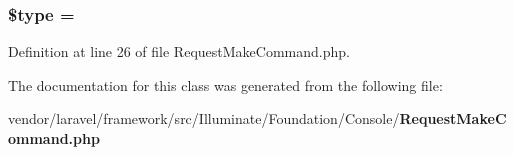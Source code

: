 \subsubsection[{\$type}]{\setlength{\rightskip}{0pt plus 5cm}\$type = \textquotesingle{}\hspace{0.3cm}{\ttfamily [protected]}}\label{class_illuminate_1_1_foundation_1_1_console_1_1_request_make_command_a9a4a6fba2208984cabb3afacadf33919}


Definition at line 26 of file Request\+Make\+Command.\+php.



The documentation for this class was generated from the following file\+:\begin{DoxyCompactItemize}
\item 
vendor/laravel/framework/src/\+Illuminate/\+Foundation/\+Console/{\bf Request\+Make\+Command.\+php}\end{DoxyCompactItemize}
